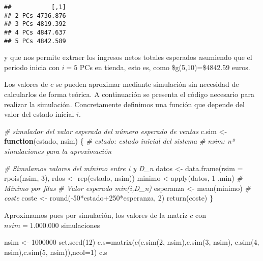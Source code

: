 \documentclass[
]{book}
\newenvironment{Shaded}{\begin{snugshade}}{\end{snugshade}}
\newcommand{\AttributeTok}[1]{\textcolor[rgb]{0.77,0.63,0.00}{#1}}
\newcommand{\CommentTok}[1]{\textcolor[rgb]{0.56,0.35,0.01}{\textit{#1}}}
\newcommand{\ControlFlowTok}[1]{\textcolor[rgb]{0.13,0.29,0.53}{\textbf{#1}}}
\newcommand{\DecValTok}[1]{\textcolor[rgb]{0.00,0.00,0.81}{#1}}
\newcommand{\FunctionTok}[1]{\textcolor[rgb]{0.00,0.00,0.00}{#1}}
\newcommand{\NormalTok}[1]{#1}
\newcommand{\OtherTok}[1]{\textcolor[rgb]{0.56,0.35,0.01}{#1}}
\newcommand{\SpecialCharTok}[1]{\textcolor[rgb]{0.00,0.00,0.00}{#1}}
\theoremstyle{definition}
\theoremstyle{definition}
\theoremstyle{definition}
\theoremstyle{definition}
\theoremstyle{remark}
\begin{document}
\begin{verbatim}
##           [,1]
## 2 PCs 4736.876
## 3 PCs 4819.392
## 4 PCs 4847.637
## 5 PCs 4842.589
\end{verbatim}

y que nos permite extraer los ingresos netos totales esperados asumiendo que el periodo inicia con \(i=5\) PCs en tienda, esto es, como \$g(5,10)=\$4842.59 euros.

Los valores de \(c\) se pueden aproximar mediante simulación sin necesidad de calcularlos de forma teórica. A continuación se presenta el código necesario para realizar la simulación. Concretamente definimos una función que depende del valor del estado inicial \(i\).

\begin{Shaded}
\begin{Highlighting}[]
\CommentTok{\# simulador del valor esperado del número esperado de ventas}
\NormalTok{c.sim }\OtherTok{\textless{}{-}} \ControlFlowTok{function}\NormalTok{(estado, nsim)}
\NormalTok{\{}
  \CommentTok{\# estado: estado inicial del sistema}
  \CommentTok{\# nsim: nº simulaciones para la aproximación}
  
  \CommentTok{\# Simulamos valores del mínimo entre i y D\_n}
\NormalTok{  datos }\OtherTok{\textless{}{-}} \FunctionTok{data.frame}\NormalTok{(}\AttributeTok{rsim =} \FunctionTok{rpois}\NormalTok{(nsim, }\DecValTok{3}\NormalTok{), rdos }\OtherTok{\textless{}{-}} \FunctionTok{rep}\NormalTok{(estado, nsim))}
\NormalTok{  minimo }\OtherTok{\textless{}{-}}\FunctionTok{apply}\NormalTok{(datos, }\DecValTok{1}\NormalTok{ ,min) }\CommentTok{\# Mínimo por filas}
  \CommentTok{\# Valor esperado min(i,D\_n)}
\NormalTok{  esperanza }\OtherTok{\textless{}{-}} \FunctionTok{mean}\NormalTok{(minimo)}
  \CommentTok{\# coste}
\NormalTok{  coste }\OtherTok{\textless{}{-}} \FunctionTok{round}\NormalTok{(}\SpecialCharTok{{-}}\DecValTok{50}\SpecialCharTok{*}\NormalTok{estado}\SpecialCharTok{+}\DecValTok{250}\SpecialCharTok{*}\NormalTok{esperanza, }\DecValTok{2}\NormalTok{)}
  \FunctionTok{return}\NormalTok{(coste)}
\NormalTok{\}}
\end{Highlighting}
\end{Shaded}

Aproximamos pues por simulación, los valores de la matriz \(c\) con \(nsim=1.000.000\) simulaciones

\begin{Shaded}
\begin{Highlighting}[]
\NormalTok{nsim }\OtherTok{\textless{}{-}} \DecValTok{1000000}
\FunctionTok{set.seed}\NormalTok{(}\DecValTok{12}\NormalTok{)}
\NormalTok{c.s}\OtherTok{=}\FunctionTok{matrix}\NormalTok{(}\FunctionTok{c}\NormalTok{(}\FunctionTok{c.sim}\NormalTok{(}\DecValTok{2}\NormalTok{, nsim),}\FunctionTok{c.sim}\NormalTok{(}\DecValTok{3}\NormalTok{, nsim),}
      \FunctionTok{c.sim}\NormalTok{(}\DecValTok{4}\NormalTok{, nsim),}\FunctionTok{c.sim}\NormalTok{(}\DecValTok{5}\NormalTok{, nsim)),}\AttributeTok{ncol=}\DecValTok{1}\NormalTok{)}
\NormalTok{c.s}
\end{Highlighting}
\end{Shaded}
\end{document}
